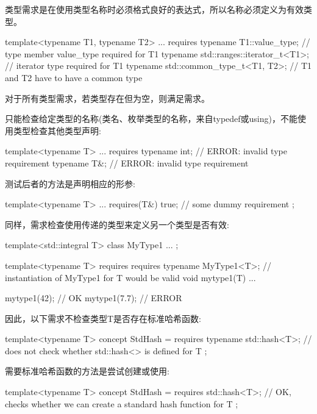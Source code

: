 类型需求是在使用类型名称时必须格式良好的表达式，所以名称必须定义为有效类型。

\begin{cpp}
template<typename T1, typename T2>
... requires {
	typename T1::value_type; // type member value_type required for T1
	typename std::ranges::iterator_t<T1>; // iterator type required for T1
	typename std::common_type_t<T1, T2>; // T1 and T2 have to have a common type
}
\end{cpp}

对于所有类型需求，若类型存在但为空，则满足需求。

只能检查给定类型的名称(类名、枚举类型的名称，来自typedef或using)，不能使用类型检查其他类型声明:

\begin{cpp}
template<typename T>
... requires {
	typename int; // ERROR: invalid type requirement
	typename T&; // ERROR: invalid type requirement
}
\end{cpp}

测试后者的方法是声明相应的形参:

\begin{cpp}
template<typename T>
... requires(T&) {
	true; // some dummy requirement
};
\end{cpp}

同样，需求检查使用传递的类型来定义另一个类型是否有效:

\begin{cpp}
template<std::integral T>
class MyType1 {
	...
};

template<typename T>
requires requires {
	typename MyType1<T>; // instantiation of MyType1 for T would be valid
}
void mytype1(T) {
	...
}

mytype1(42); // OK
mytype1(7.7); // ERROR
\end{cpp}

因此，以下需求不检查类型T是否存在标准哈希函数:

\begin{cpp}
template<typename T>
concept StdHash = requires {
	typename std::hash<T>; // does not check whether std::hash<> is defined for T
};
\end{cpp}

需要标准哈希函数的方法是尝试创建或使用:

\begin{cpp}
template<typename T>
concept StdHash = requires {
	std::hash<T>{}; // OK, checks whether we can create a standard hash function for T
};
\end{cpp}

